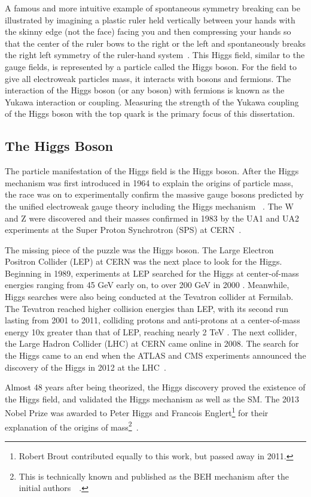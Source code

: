 A famous and more intuitive example of spontaneous symmetry breaking can be illustrated
by imagining a plastic ruler held vertically between your hands with the skinny edge (not the face) facing you and then compressing your hands so that the center of the ruler bows to the right or the left and
spontaneously breaks the right left symmetry of the ruler-hand system~\cite{robinson}.
This Higgs field, similar to the gauge fields, is represented by a particle called the Higgs boson.
For the field to give all electroweak particles mass, it interacts with bosons and fermions.
The interaction of the Higgs boson (or any boson) with fermions is known as the Yukawa interaction or coupling. Measuring the strength of the Yukawa coupling
of the Higgs boson with the top quark is the primary focus of this dissertation.

\subsection{The Higgs Boson}

The particle manifestation of the Higgs field is the Higgs boson. After the Higgs mechanism was first introduced in 1964 to explain the origins of particle mass,
the race was on to experimentally confirm the massive gauge bosons predicted by the unified electroweak gauge theory including the Higgs mechanism ~\cite{1964_prl_higgs}.
The W and Z were discovered and their masses confirmed in 1983 by the UA1 and UA2 experiments at the Super Proton Synchrotron (SPS) at CERN~\cite{UA1}\cite{UA2}\cite{Z}.

The missing piece of the puzzle was the Higgs boson. The Large Electron Positron Collider (LEP) at CERN was the next place to look for the Higgs.
Beginning in 1989, experiments at LEP searched for the Higgs at center-of-mass energies ranging from 45 GeV early on, to over 200 GeV in 2000 \cite{LEPHIGGS}. Meanwhile, Higgs
searches were also being conducted at the Tevatron collider at Fermilab. The Tevatron reached higher collision energies than LEP, with its second run lasting from 2001
to 2011, colliding protons and anti-protons at a center-of-mass energy 10x greater than that of LEP, reaching nearly 2 TeV \cite{TEVHIGGS_2010}. The next collider, the Large Hadron Collider
(LHC) at CERN came online in 2008. The search for the Higgs came to an end when the ATLAS and CMS experiments announced the discovery of the Higgs in 2012 at the LHC~\cite{cms_higgs}\cite{atlas_higgs}. 

Almost 48 years after being theorized, the Higgs discovery proved the existence
of the Higgs field, and validated the Higgs mechanism as well as the SM. The 2013 Nobel Prize was awarded to
Peter Higgs and Francois Englert\footnote{Robert Brout contributed equally to this work, but passed away in 2011.} for their explanation of the origins of mass\footnote{This is
technically known and published as the BEH mechanism after the initial authors~\cite{1964_prl_higgs}~\cite{1964_prl_englert}.}~\cite{NP13}.

